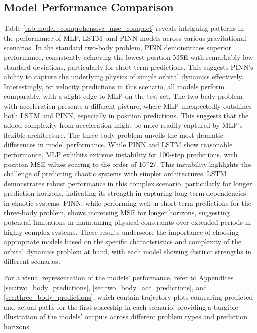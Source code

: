 \documentclass[11pt,a4paper, twocolumn]{article}
\begin{document}
\subsection{Model Performance Comparison}

Table \ref{tab:model_comprehensive_mse_compact} reveals intriguing patterns in the performance of MLP, LSTM, and PINN models across various gravitational scenarios. In the standard two-body problem, PINN demonstrates superior performance, consistently achieving the lowest position MSE with remarkably low standard deviations, particularly for short-term predictions. This suggests PINN's ability to capture the underlying physics of simple orbital dynamics effectively. Interestingly, for velocity predictions in this scenario, all models perform comparably, with a slight edge to MLP on the test set. The two-body problem with acceleration presents a different picture, where MLP unexpectedly outshines both LSTM and PINN, especially in position predictions. This suggests that the added complexity from acceleration might be more readily captured by MLP's flexible architecture. The three-body problem unveils the most dramatic differences in model performance. While PINN and LSTM show reasonable performance, MLP exhibits extreme instability for 100-step predictions, with position MSE values soaring to the order of 10^27. This instability highlights the challenge of predicting chaotic systems with simpler architectures. LSTM demonstrates robust performance in this complex scenario, particularly for longer prediction horizons, indicating its strength in capturing long-term dependencies in chaotic systems. PINN, while performing well in short-term predictions for the three-body problem, shows increasing MSE for longer horizons, suggesting potential limitations in maintaining physical constraints over extended periods in highly complex systems. These results underscore the importance of choosing appropriate models based on the specific characteristics and complexity of the orbital dynamics problem at hand, with each model showing distinct strengths in different scenarios.

For a visual representation of the models' performance, refer to Appendices \ref{sec:two_body_predictions}, \ref{sec:two_body_acc_predictions}, and \ref{sec:three_body_predictions}, which contain trajectory plots comparing predicted and actual paths for the first spaceship in each scenario, providing a tangible illustration of the models' outputs across different problem types and prediction horizons.
\end{document}
